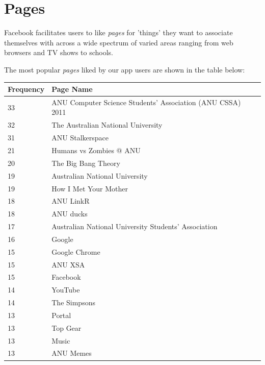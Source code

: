 \section{Pages}
\label{sec:pages}

Facebook facilitates users to like \emph{pages} for 'things' they want to associate themselves with across a wide spectrum of varied areas ranging from 
web browsers and TV shows to schools. 

\clearpage

The most popular \emph{pages} liked by our app users are shown in the table below:

\begin{table}[!htbp]
\centering
	\begin{tabular}{|l|l|} %
		\hline
		\textbf{\small{Frequency}} & \textbf{\small{Page Name}}  \\ \hline
		33 & \small{ANU Computer Science Students' Association (ANU CSSA) 2011} \\ \hline
		32 & \small{The Australian National University} \\ \hline
		31 & \small{ANU Stalkerspace} \\ \hline
		21 & \small{Humans vs Zombies @ ANU} \\ \hline
		20 & \small{The Big Bang Theory} \\ \hline
		19 & \small{Australian National University} \\ \hline
		19 & \small{How I Met Your Mother} \\ \hline
		18 & \small{ANU LinkR} \\ \hline
		18 & \small{ANU ducks} \\ \hline
		17 & \small{Australian National University Students' Association} \\ \hline
		16 & \small{Google} \\ \hline
		15 & \small{Google Chrome} \\ \hline
		15 & \small{ANU XSA} \\ \hline
		15 & \small{Facebook} \\ \hline
		14 & \small{YouTube} \\ \hline
		14 & \small{The Simpsons} \\ \hline
		13 & \small{Portal} \\ \hline
		13 & \small{Top Gear} \\ \hline
		13 & \small{Music} \\ \hline
		13 & \small{ANU Memes} \\ \hline

\end{tabular}
\end{table}
